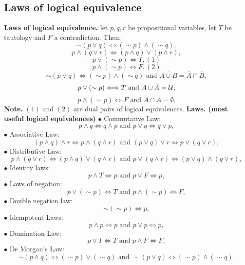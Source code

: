 \documentclass{article}
\begin{document}
\subsection{Laws of logical equivalence}
\textbf{Laws of logical equivalence. } let $p, q, r$ be propositional variables, let $T$ be tautology and $F$ a contradiction. Then:
$$\sim (p \vee q) \Longleftrightarrow (\sim p) \land (\sim q),$$
$$p \land (q \vee r) \Longleftrightarrow (p \land q) \vee (p \land r),$$
$$p \vee (\sim p) \Longleftrightarrow T, (1)$$
$$p \land (\sim p) \Longleftrightarrow F, (2)$$
$$\sim(p \vee q) \Longleftrightarrow (\sim p) \land (\sim q) \text{ and } \overline{ A \cup B } = \bar{ A } \cap \bar{ B },$$
$$p \vee (\sim p) \Longleftrightarrow T \text{ and } A \cup \bar{A} = \cal U,$$
$$p \land (\sim p) \Longleftrightarrow F \text { and } A \cap \bar{A} = \emptyset.$$
\textbf{Note. } $(1)$ and $(2)$ are dual pairs of logical equivalences.
\newline
\newline
\textbf{Laws. (most useful logical equivalences)}
\newline
$\bullet $ Commutative Law:
$$p \land q \Longleftrightarrow q \land p \text{ and } p \vee q \Longleftrightarrow q \vee p,$$
\newline
$\bullet $ Associative Law:
$$(p \land q) \land r \Longleftrightarrow p \land (q \land r) \text{ and } (p \vee q) \vee r \Longleftrightarrow p \vee (q \vee r),$$
\newline
$\bullet $ Distributive Law:
$$p \land (q \vee r) \Longleftrightarrow (p \land q) \vee (q \land r) \text{ and } p \vee (q \land r) \Longleftrightarrow (p \vee q) \land (q \vee r),$$
\newline
$\bullet $ Identity laws:
$$p \land T \Longleftrightarrow p \text{ and } p \vee F \Longleftrightarrow p,$$
\newline
$\bullet $ Laws of negation:
$$p \vee (\sim p) \Longleftrightarrow T \text{ and } p \land (\sim p) \Longleftrightarrow F,$$
\newline
$\bullet $ Double negation law:
$$\sim(\sim p) \Longleftrightarrow p,$$
\newline
$\bullet $ Idempotent Laws:
$$p \land p \Longleftrightarrow p \text{ and } p \vee p \Longleftrightarrow p,$$
\newline
$\bullet $ Domination Law:
$$p \vee T \Longleftrightarrow T \text{ and } p \land F \Longleftrightarrow F,$$
\newline
$\bullet $ De Morgan's Law:
$$\sim(p \land q) \Longleftrightarrow (\sim p) \vee (\sim q) \text{ and } \sim(p \vee q) \Longleftrightarrow (\sim p) \land (\sim q).$$
\end{document}
